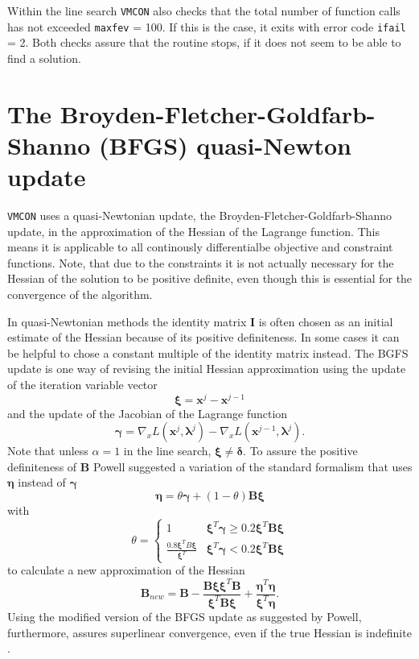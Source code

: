 \documentclass[11pt,a4paper]{report}
\newcommand{\ifail}{\mbox{\texttt{ifail}}}
\newcommand{\mat}[1]{\mathbf{#1}}
\newcommand{\vmcon}{\mbox{\texttt{VMCON}}}
\renewcommand{\vec}[1]{\boldsymbol{#1}}
\begin{document}
Within the line search \vmcon\/ also checks that the total number of function
calls has not exceeded \texttt{maxfev} = 100. If this is the case, it exits
with error code \ifail\/ = 2. Both checks assure that the routine stops, if it
does not seem to be able to find a solution.


\section{The Broyden-Fletcher-Goldfarb-Shanno (BFGS) quasi-Newton update}
\label{sec:BFGS}

\vmcon\/ uses a quasi-Newtonian update, the Broyden-Fletcher-Goldfarb-Shanno
update, in the approximation of the Hessian of the Lagrange function. This
means it is applicable to all continously differentialbe objective and
constraint functions. Note, that due to the constraints it is not actually
necessary for the Hessian of the solution to be positive definite, even though
this is essential for the convergence of the algorithm.

In quasi-Newtonian methods the identity matrix $\mat{I}$ is often chosen as an
initial estimate of the Hessian because of its positive definiteness. In some
cases it can be helpful to chose a constant multiple of the identity matrix
instead. The BGFS update \cite{Avriel2003} is one way of revising the initial
Hessian approximation using the update of the iteration variable vector
\begin{equation}
\vec{\xi} = \vec{x}^{j} - \vec{x}^{j-1}
\end{equation}
and the update of the Jacobian of the Lagrange function
\begin{equation}
\vec{\gamma} = \nabla_x L(\vec{x}^j,\vec{\lambda}^{j}) - \nabla_x
L(\vec{x}^{j-1},\vec{\lambda}^{j}). %
\end{equation}
Note that unless $\alpha=1$ in the line search, $\vec{\xi} \neq
\vec{\delta}$. To assure the positive definiteness of $\mat{B}$ Powell
\cite{Powell1978} suggested a variation of the standard formalism that uses
$\vec{\eta}$ instead of $\vec{\gamma}$
\begin{equation}
\vec{\eta} = \theta \vec{\gamma} + (1-\theta) \mat{B} \vec{\xi}
\end{equation}
with 
\begin{equation}
\theta = \left\{
\begin{array}{lr}
1 & \vec{\xi}^T \vec{\gamma} \geq 0.2 \vec{\xi}^T \mat{B} \vec{\xi} \\
\frac{0.8 \vec{\xi}^T B \vec{\xi}}{\vec{\xi}^T} & \vec{\xi}^T \vec{\gamma} <
0.2 \vec{\xi}^T \mat{B} \vec{\xi}
\end{array}
\right.
\end{equation}
to calculate a new approximation of the Hessian
\begin{equation}
\mat{B}_{new} = \mat{B} - \frac{\mat{B} \vec{\xi} \vec{\xi}^T
  \mat{B}}{\vec{\xi}^T \mat{B} \vec{\xi}}+\frac{\vec{\eta}^T
  \vec{\eta}}{\vec{\xi}^T \vec{\eta}}.
\end{equation}
Using the modified version of the BFGS update as suggested by Powell,
furthermore, assures superlinear convergence, even if the true Hessian is
indefinite \cite{Powell1977}.
\end{document}
